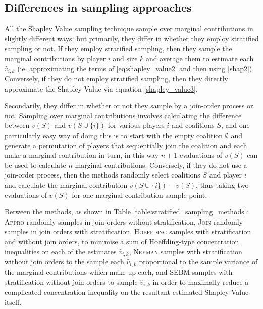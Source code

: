 \subsection{Differences in sampling approaches}

All the Shapley Value sampling technique sample over marginal contributions in slightly different ways; but primarily, they differ in whether they employ stratified sampling or not.
If they employ stratified sampling, then they sample the marginal contributions by player $i$ and size $k$ and average them to estimate each $\hat{v}_{i,k}$ (ie. approximating the terms of \eqref{eq:shapley_value2} and then using \eqref{shap2}).
Conversely, if they do not employ stratified sampling, then they directly approximate the Shapley Value via equation \eqref{shapley_value3}.

Secondarily, they differ in whether or not they sample by a join-order process or not. Sampling over marginal contributions involves calculating the difference between $v(S)$ and $v(S\cup\{i\})$ for various players $i$ and coalitions $S$, and one particularly easy way of doing this is to start with the empty coalition $\emptyset$ and generate a permutation of players that sequentially join the coalition and each make a marginal contribution in turn, in this way $n+1$ evaluations of $v(S)$ can be used to calculate $n$ marginal contributions.
Conversely, if they do not use a join-order process, then the methods randomly select coalitions $S$ and player $i$ and calculate the marginal contribution $v(S\cup\{i\}) - v(S)$, thus taking two evaluations of $v(S)$ for one marginal contribution sample point.

Between the methods, as shown in Table \ref{table:stratified_sampling_methods}: \textsc{Appro} randomly samples in join orders without stratification, \textsc{Join} randomly samples in join orders with stratification, \textsc{Hoeffding} samples with stratification and without join orders, to minimise a sum of Hoeffding-type concentration inequalities on each of the estimates $\hat{v}_{i,k}$,
\textsc{Neyman} samples with stratification without join orders to the sample each $\hat{v}_{i,k}$ proportional to the sample variance of the marginal contributions which make up each,
and \textsc{SEBM} samples with stratification without join orders to sample $\hat{v}_{i,k}$ in order to maximally reduce a complicated concentration inequality on the resultant estimated Shapley Value itself.

